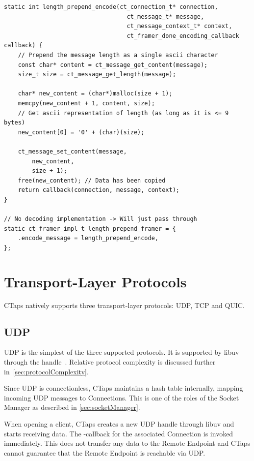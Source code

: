 \begin{listing}[htbp]
  \begin{verbatim}
static int length_prepend_encode(ct_connection_t* connection,
                                   ct_message_t* message,
                                   ct_message_context_t* context,
                                   ct_framer_done_encoding_callback callback) {
    // Prepend the message length as a single ascii character
    const char* content = ct_message_get_content(message);
    size_t size = ct_message_get_length(message);

    char* new_content = (char*)malloc(size + 1);
    memcpy(new_content + 1, content, size);
    // Get ascii representation of length (as long as it is <= 9 bytes)
    new_content[0] = '0' + (char)(size);

    ct_message_set_content(message,
        new_content,
        size + 1);
    free(new_content); // Data has been copied
    return callback(connection, message, context);
}

// No decoding implementation -> Will just pass through
static ct_framer_impl_t length_prepend_framer = {
    .encode_message = length_prepend_encode,
};

  \end{verbatim}
\caption[Framer implementation]{Example Framer implementation from the CTaps framing tests.}
\label{lst:framingTestImpl}
\end{listing}

\section{Transport-Layer Protocols}
CTaps natively supports three transport-layer protocols: UDP, TCP and QUIC.

\subsection{UDP} \label{sec:udpImpl}
UDP is the simplest of the three supported protocols.
It is supported by libuv through the  handle~\cite{libuvLibuvUDPHandle}.
Relative protocol complexity is discussed further in~\cref{sec:protocolComplexity}.

Since UDP is connectionless, CTaps maintains
a hash table internally, mapping incoming UDP messages
to Connections. This is one of the roles of the
Socket Manager as described in \cref{sec:socketManager}.

When opening a client, CTaps creates a new UDP handle through libuv
and starts receiving data.
The -callback for the associated Connection is invoked immediately.
This does not transfer any data to the Remote Endpoint
and CTaps cannot guarantee that the Remote Endpoint is reachable via UDP.

